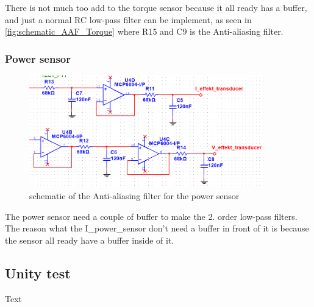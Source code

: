 There is not much too add to the torque sensor because it all ready has a buffer, and just a normal RC low-pass filter can be implement, as seen in \vref{fig:schematic_AAF_Torque} where R15 and C9 is the Anti-aliasing filter.
	
\subsubsection*{Power sensor}

\begin{figure}[H]
	\centering
	\includegraphics [width=4in]{Hardware/Pictures/AAF_effekt.PNG}
	\caption{schematic of the Anti-aliasing filter for the power sensor}
	\label{fig:schematic_AAF_power}
\end{figure}
	
The power sensor need a couple of buffer to make the 2. order low-pass filters. The reason what the I\_power\_sensor don't need a buffer in front of it is because the sensor all ready have a buffer inside of it.   

\subsection{Unity test}
Text 